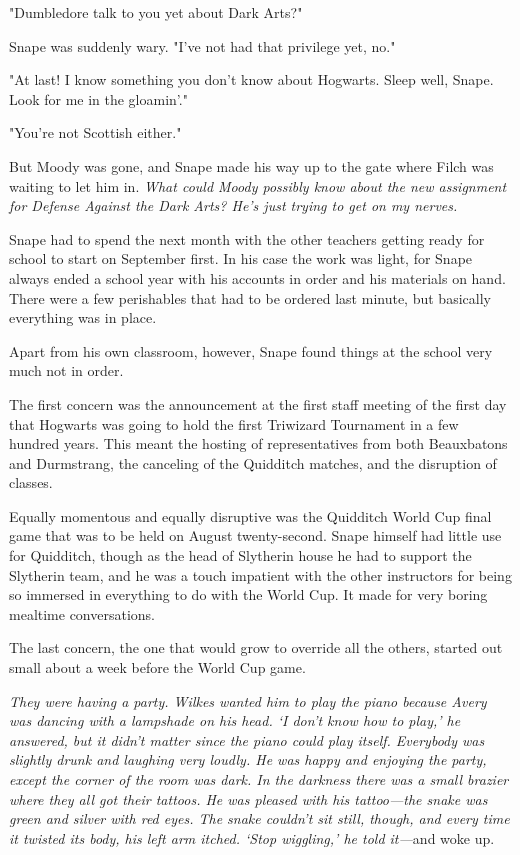 "Dumbledore talk to you yet about Dark Arts?"

Snape was suddenly wary. "I've not had that privilege yet, no."

"At last! I know something you don't know about Hogwarts. Sleep well, Snape. Look for me in the gloamin'."

"You're not Scottish either."

But Moody was gone, and Snape made his way up to the gate where Filch was waiting to let him in. \emph{What could Moody possibly know about the new assignment for Defense Against the Dark Arts? He's just trying to get on my nerves.}

\sbreak

Snape had to spend the next month with the other teachers getting ready for school to start on September first. In his case the work was light, for Snape always ended a school year with his accounts in order and his materials on hand. There were a few perishables that had to be ordered last minute, but basically everything was in place.

Apart from his own classroom, however, Snape found things at the school very much not in order.

The first concern was the announcement at the first staff meeting of the first day that Hogwarts was going to hold the first Triwizard Tournament in a few hundred years. This meant the hosting of representatives from both Beauxbatons and Durmstrang, the canceling of the Quidditch matches, and the disruption of classes.

Equally momentous and equally disruptive was the Quidditch World Cup final game that was to be held on August twenty-second. Snape himself had little use for Quidditch, though as the head of Slytherin house he had to support the Slytherin team, and he was a touch impatient with the other instructors for being so immersed in everything to do with the World Cup. It made for very boring mealtime conversations.

The last concern, the one that would grow to override all the others, started out small about a week before the World Cup game.

\sbreak

\emph{They were having a party. Wilkes wanted him to play the piano because Avery was dancing with a lampshade on his head. `I don't know how to play,' he answered, but it didn't matter since the piano could play itself. Everybody was slightly drunk and laughing very loudly. He was happy and enjoying the party, except the corner of the room was dark. In the darkness there was a small brazier where they all got their tattoos. He was pleased with his tattoo—the snake was green and silver with red eyes. The snake couldn't sit still, though, and every time it twisted its body, his left arm itched. `Stop wiggling,' he told it—}and woke up.


